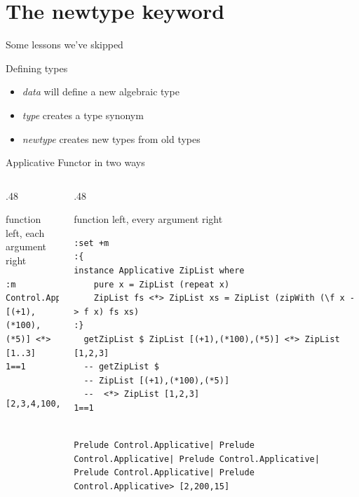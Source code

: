 \documentclass[presetation]{beamer}
\begin{document}
\section{The newtype keyword}
\label{sec:orgb3ff708}
\begin{frame}[label={sec:orgc10b843}]{Some lessons we've skipped}
\begin{block}{Defining types}
\begin{itemize}
\item \emph{data} will define a new algebraic type
\item \emph{type} creates a type synonym
\item \emph{newtype} creates new types from old types
\end{itemize}
\end{block}
\end{frame}

\begin{frame}[fragile,label={sec:org9b4aac9}]{Applicative Functor in two ways}
 \begin{columns}
\begin{column}{.48\columnwidth}
\begin{block}{function left, each argument right}
\begin{verbatim}
:m Control.Applicative
[(+1),(*100),(*5)] <*> [1..3]
1==1
\end{verbatim}

\begin{verbatim}

[2,3,4,100,200,300,5,10,15]
\end{verbatim}
\end{block}
\end{column}

\begin{column}{.48\columnwidth}
\begin{block}{function left, every argument right}
\begin{verbatim}
:set +m
:{
instance Applicative ZipList where  
	pure x = ZipList (repeat x)  
	ZipList fs <*> ZipList xs = ZipList (zipWith (\f x -> f x) fs xs)  
:}
  getZipList $ ZipList [(+1),(*100),(*5)] <*> ZipList [1,2,3]
  -- getZipList $
  -- ZipList [(+1),(*100),(*5)]
  --  <*> ZipList [1,2,3]
1==1
\end{verbatim}

\begin{verbatim}

Prelude Control.Applicative| Prelude Control.Applicative| Prelude Control.Applicative| Prelude Control.Applicative| Prelude Control.Applicative> [2,200,15]
\end{verbatim}
\end{block}
\end{column}
\end{columns}
\end{frame}
\end{document}
